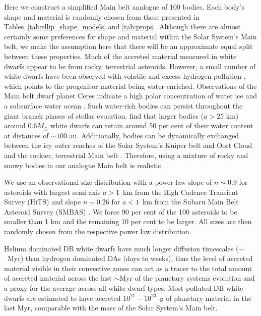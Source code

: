 \documentclass[fleqn,usenatbib]{mnras}
\begin{document}
Here we construct a simplified Main belt analogue of 100 bodies. 
Each body's shape and material is randomly chosen from those presented in Tables~\ref{tab:ellip_shape_models} and \ref{tab:props}.
Although there are almost certainly some preferences for shape and material within the Solar System's Main belt, we make the assumption here that there will be an approximate equal split between these properties. 
Much of the accreted material measured in white dwarfs appear to be from rocky, terrestrial asteroids.
However, a small number of white dwarfs have been observed with volatile and excess hydrogen pollution \citep{Farihi2013, Raddi2015, GentileFusillo2017, Xu2017, Hoskin2020}, which points to the progenitor material being water-enriched. 
Observations of the Main belt dwarf planet Ceres indicate a high polar concentration of water ice and a subsurface water ocean \citep{Prettyman2017}. 
Such water-rich bodies can persist throughout the giant branch phases of stellar evolution. \cite{Malamud2017a} find that larger bodies ($a > 25$ km) around $0.6M_\odot$ white dwarfs can retain around 50 per cent of their water content at distances of $\sim 100$ au. 
Additionally, bodies can be dynamically exchanged between the icy outer reaches of the Solar System's Kuiper belt and Oort Cloud and the rockier, terrestrial Main belt \citep{Weissman1997, Shannon2015}.
Therefore, using a mixture of rocky and snowy bodies in our analogue Main belt is realistic. 

We use an observational size distribution with a power law slope of $n \sim 0.9$ for asteroids with largest semi-axis $a > 1$~km from the High Cadence Transient Survey (HiTS) \citep{Pena2020} and slope $n \sim 0.26$ for $a < 1$~km from the Subaru Main Belt Asteroid Survey (SMBAS) \citep{Yoshida2007}.
We force 90 per cent of the 100 asteroids to be smaller than 1 km and the remaining 10 per cent to be larger. 
All sizes are then randomly chosen from the respective power law distribution.

Helium dominated DB white dwarfs have much longer diffusion timescales ($\sim$~Myr) than hydrogen dominated DAs (days to weeks), thus the level of accreted material visible in their convective zones can act as a tracer to the total amount of accreted material across the last $\sim$Myr of the planetary systems evolution and a proxy for the average across all white dwarf types.
Most polluted DB white dwarfs are estimated to have accreted $10^{21}-10^{23}$~g of planetary material \citep{Farihi2010, Xu2012, Girven2012, Veras2016a} in the last Myr, comparable with the mass of the Solar System's Main belt. 
\end{document}
